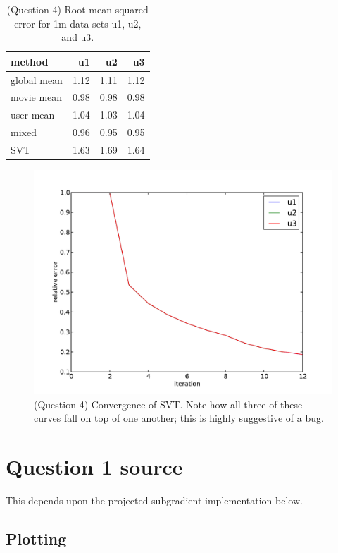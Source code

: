 \documentclass{article}
\begin{document}
\begin{table}
\center
\begin{tabular}{|l|rrr|}
  \hline
  method      & u1    & u2    & u3    \\
  \hline
  global mean & 1.12  & 1.11  & 1.12  \\
  movie mean  & 0.98  & 0.98  & 0.98  \\
  user mean   & 1.04  & 1.03  & 1.04  \\
  mixed       & 0.96  & 0.95  & 0.95  \\
  SVT         & 1.63  & 1.69  & 1.64  \\
  \hline
\end{tabular}
\caption{(Question 4) Root-mean-squared error for 1m data sets u1, u2, and u3.}
\end{table}

\begin{figure}
\center
\includegraphics[scale=0.5]{q4-convergence.pdf}
\caption{(Question 4) Convergence of SVT. Note how all three of these
curves fall on top of one another; this is highly suggestive of a
bug.}
\end{figure}

\appendix

\section{Question 1 source}\label{Q1Source}
This depends upon the projected subgradient implementation below.

\subsection{Plotting}

\end{document}
